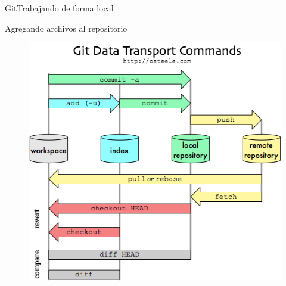 \documentclass[10pt]{beamer}
\begin{document}
\begin{frame}{Git}{Trabajando de forma local}

\begin{block}{Agregando archivos al repositorio}

\begin{figure}[h!]
\centering
\includegraphics [scale=0.4]{addcommitpush}
\label{fig:gitstatus}
\end{figure}

\end{block}

\end{frame}
\end{document}
